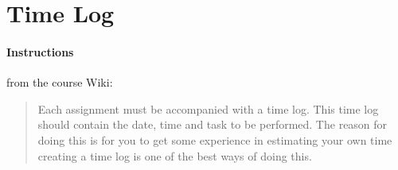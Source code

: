 %
%
%
%


\section{Time Log}\label{time-log}

\paragraph{Instructions}\label{time-log-instructions}
from the course Wiki\cite{1dv600:lab1:instructions}:

\begin{quote}
  Each assignment must be accompanied with a time log. This time log should
  contain the date, time and task to be performed. The reason for doing this is
  for you to get some experience in estimating your own time creating a time
  log is one of the best ways of doing this.
\end{quote}




